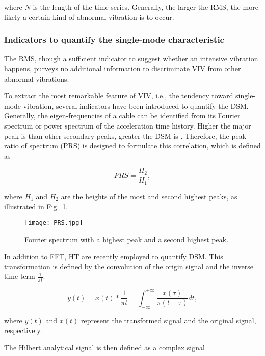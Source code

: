\documentclass[preprint, 3p, times, compress, 11pt]{elsarticle}
\begin{document}
where $N$ is the length of the time series. Generally, the larger the RMS, 
the more likely a certain kind of abnormal vibration is to occur.

\subsubsection{Indicators to quantify the single-mode characteristic}

The RMS, though a sufficient indicator to suggest whether an intensive 
vibration happens, purveys no additional information to 
discriminate VIV from other abnormal vibrations. 

To extract the most remarkable feature of VIV, i.e., the tendency toward 
single-mode vibration, several indicators have been introduced to quantify 
the DSM. Generally, the eigen-frequencies of a cable can be identified 
from its Fourier spectrum or power spectrum of the 
acceleration time history. Higher the major peak is than other secondary 
peaks, greater the DSM is \cite{he2022online}. Therefore, the peak ratio 
of spectrum (PRS) is designed 
to formulate this correlation, which is defined as 

\begin{equation}
    PRS = \frac{H_2}{H_1}, 
    \label{eq:PRS}
\end{equation}

where $H_1$ and $H_2$ are the heights of the most and second highest peaks, 
as illustrated in Fig.~\ref{fig:PRS}.

\begin{figure}[ht]
    \centering
    \texttt{[image: PRS.jpg]}
    \caption{Fourier spectrum with a highest peak and a second highest peak.}
    \label{fig:PRS}
\end{figure}

In addition to FFT, HT are recently employed to quantify DSM. This transformation 
is defined by the convolution of the origin signal and the inverse time 
term $\frac{1}{\pi t}$: 

\begin{equation}
    y(t) = x(t) * \frac{1}{\pi t} = \int_{-\infty}^{+\infty} 
            \frac{x(\tau)}{\pi(t-\tau)} dt, 
    \label{eq:hilb}
\end{equation}

where $y(t)$ and $x(t)$ represent the transformed signal and the 
original signal, respectively. 

The Hilbert analytical signal is then defined as a complex signal 
\end{document}
